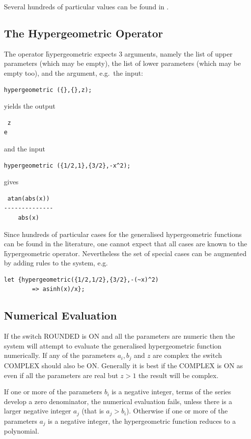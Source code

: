 Several hundreds of particular values can be found in \cite{Prudnikov:90c}.

\hypertarget{operator:HYPERGEOMETRIC}{}
\subsection{The Hypergeometric Operator}

The operator \f{hypergeometric} expects 3 arguments, namely the 
list of upper parameters (which may be empty), the list of lower
parameters (which may be empty too), and the argument, e.g.\ the input:
\begin{verbatim}
hypergeometric ({},{},z);
\end{verbatim}
yields the output
\begin{verbatim}
 z
e
\end{verbatim}
and the input
\begin{verbatim}
hypergeometric ({1/2,1},{3/2},-x^2);
\end{verbatim}
gives
\begin{verbatim}
 atan(abs(x))
--------------
    abs(x)
\end{verbatim}


Since hundreds of particular cases for the generalised hypergeometric
functions can be found in the literature, one cannot expect that all
cases are known to the \f{hypergeometric} operator.
Nevertheless the set of special cases can be augmented by adding
rules to the \REDUCE{} system, e.g.
\begin{verbatim}
let {hypergeometric({1/2,1/2},{3/2},-(~x)^2)
        => asinh(x)/x};
\end{verbatim}

\subsection{Numerical Evaluation}
If the switch ROUNDED is ON and all the parameters are numeric then the system
will attempt to evaluate the generalised hypergeometric function numerically.
If any of the parameters $a_i, b_j$ and $z$ are complex the switch COMPLEX
should also be ON. Generally it is best if the COMPLEX is ON as even if all the
parameters are real but $z>1$ the result will be complex.

If one or more of the parameters $b_i$ is a negative integer, terms
of the series develop a zero denominator, the numerical evaluation fails,
unless there is a larger negative integer $a_j$ (that is $a_j>b_i$).
Otherwise if one or more of the parameters $a_j$ is a negative integer, the
hypergeometric function reduces to a polynomial. 

